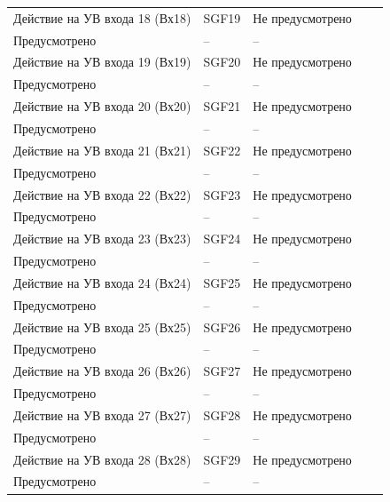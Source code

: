 \begin{longtable}{|>{\centering\arraybackslash}m{5.3cm}|>{\centering\arraybackslash}m{3.3cm}|>{\centering\arraybackslash}m{4.2cm}|>{\centering\arraybackslash}m{1.8cm}|>{\centering\arraybackslash}m{1cm}|}
\hline
\centering Действие на УВ входа 18 (Вх18)  & \centering SGF19 & \centering Не предусмотрено \\ Предусмотрено & \centering -- & \centering \arraybackslash -- \\
\hline
\centering Действие на УВ входа 19 (Вх19)  & \centering SGF20 & \centering Не предусмотрено \\ Предусмотрено & \centering -- & \centering \arraybackslash -- \\
\hline
\centering Действие на УВ входа 20 (Вх20)  & \centering SGF21 & \centering Не предусмотрено \\ Предусмотрено & \centering -- & \centering \arraybackslash -- \\
\hline
\centering Действие на УВ входа 21 (Вх21)  & \centering SGF22 & \centering Не предусмотрено \\ Предусмотрено & \centering -- & \centering \arraybackslash -- \\
\hline
\centering Действие на УВ входа 22 (Вх22)  & \centering SGF23 & \centering Не предусмотрено \\ Предусмотрено & \centering -- & \centering \arraybackslash -- \\
\hline
\centering Действие на УВ входа 23 (Вх23)  & \centering SGF24 & \centering Не предусмотрено \\ Предусмотрено & \centering -- & \centering \arraybackslash -- \\
\hline
\centering Действие на УВ входа 24 (Вх24)  & \centering SGF25 & \centering Не предусмотрено \\ Предусмотрено & \centering -- & \centering \arraybackslash -- \\
\hline
\centering Действие на УВ входа 25 (Вх25)  & \centering SGF26 & \centering Не предусмотрено \\ Предусмотрено & \centering -- & \centering \arraybackslash -- \\
\hline
\centering Действие на УВ входа 26 (Вх26)  & \centering SGF27 & \centering Не предусмотрено \\ Предусмотрено & \centering -- & \centering \arraybackslash -- \\
\hline
\centering Действие на УВ входа 27 (Вх27)  & \centering SGF28 & \centering Не предусмотрено \\ Предусмотрено & \centering -- & \centering \arraybackslash -- \\
\hline
\centering Действие на УВ входа 28 (Вх28)  & \centering SGF29 & \centering Не предусмотрено \\ Предусмотрено & \centering -- & \centering \arraybackslash -- \\

\end{longtable}
